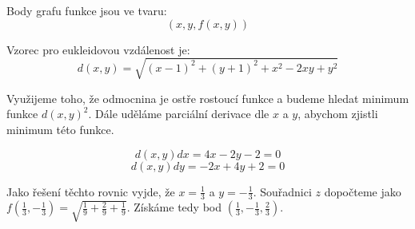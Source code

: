 \documentclass[a4paper, 11pt]{article}
\begin{document}
  Body grafu funkce jsou ve tvaru:
  $$(x,y,f(x,y))$$
  
  Vzorec pro eukleidovou vzdálenost je:
  $$d(x,y) = \sqrt{(x-1)^2+(y+1)^2+x^2-2xy+y^2}$$
  
  Využijeme toho, že odmocnina je ostře rostoucí funkce a budeme hledat minimum funkce $d(x,y)^2$. 
  Dále uděláme parciální derivace dle $x$ a $y$, abychom zjistli minimum této funkce.
  
  $$d(x,y)dx = 4x-2y-2 = 0$$
  $$d(x,y)dy = -2x+4y+2 = 0$$
  
  Jako řešení těchto rovnic vyjde, že $x = \frac{1}{3}$ a $y = -\frac{1}{3}$.
  Souřadnici $z$ dopočteme jako $f(\frac{1}{3},-\frac{1}{3}) = \sqrt{\frac{1}{9}+\frac{2}{9}+\frac{1}{9}}$. Získáme tedy bod $(\frac{1}{3},-\frac{1}{3},\frac{2}{3})$.
  
  
\end{document}
